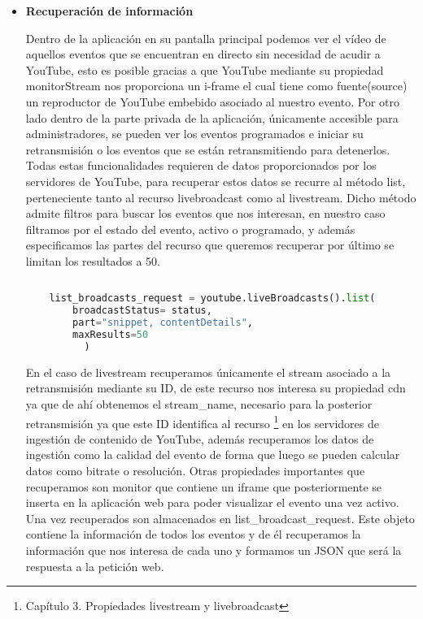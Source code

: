 \begin{itemize}
    \item \textbf{Recuperación de información}
    
    Dentro de la aplicación en su pantalla principal podemos ver el vídeo de aquellos eventos que se encuentran en directo sin necesidad de acudir a YouTube, esto es posible gracias a que YouTube mediante su propiedad monitorStream nos proporciona un i-frame el cual tiene como fuente(source) un reproductor de YouTube embebido asociado al nuestro evento. Por otro lado dentro de la parte privada de la aplicación, únicamente accesible para administradores, se pueden ver los eventos programados e iniciar su retransmisión o los eventos que se están retransmitiendo para detenerlos.
    Todas estas funcionalidades requieren de datos proporcionados por los servidores de YouTube, para recuperar estos datos se recurre al método list, perteneciente tanto al recurso livebroadcast como al livestream. Dicho método admite filtros para buscar los eventos que nos interesan, en nuestro caso filtramos por el estado del evento, activo o programado, y además especificamos las partes del recurso que queremos recuperar  por último se limitan los resultados a 50.
    
    \begin{lstlisting}[language =Python]
    
    list_broadcasts_request = youtube.liveBroadcasts().list(
        broadcastStatus= status,
        part="snippet, contentDetails",
        maxResults=50
          )
    \end{lstlisting}

    En el caso de livestream recuperamos únicamente el stream asociado a la retransmisión mediante su ID, de este recurso nos interesa su propiedad cdn ya que de ahí obtenemos el stream\_name, necesario para la posterior retransmisión ya que este ID identifica al recurso \footnote{Capítulo 3. Propiedades livestream y livebroadcast} en los servidores de ingestión de contenido de YouTube, además recuperamos los datos de ingestión como la calidad del evento de forma que luego se pueden calcular datos como bitrate o resolución. Otras propiedades importantes que recuperamos son monitor que contiene un iframe que posteriormente se inserta en la aplicación web para poder visualizar el evento una vez activo.
    Una vez recuperados son almacenados en list\_broadcast\_request. Este objeto contiene la información de todos los eventos y de él recuperamos la información que nos interesa de cada uno y formamos un JSON que será la respuesta a la petición web.
    \\



\end{itemize}
